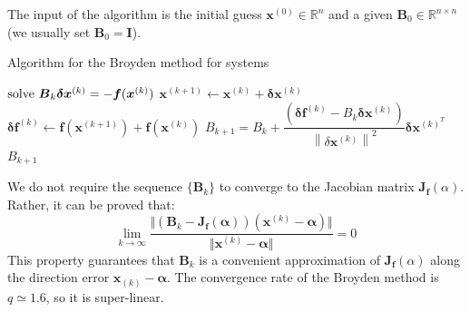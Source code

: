 \documentclass[12pt, a4paper]{report}
\begin{document}
    The input of the algorithm is the initial guess $\boldsymbol{x}^{(0)} \in \mathbb{R}^n$ and a given $\boldsymbol{B}_0 \in \mathbb{R}^{n \times n}$ (we usually set $\boldsymbol{B}_0=\boldsymbol{I}$). 
    \begin{algorithm}[H]
        \caption{Algorithm for the Broyden method for systems}
            \begin{algorithmic}[1]
                    \State $\textnormal{solve  } \boldsymbol{B}_k\boldsymbol{\delta}\boldsymbol{x}^{(k)}=-\boldsymbol{f}(\boldsymbol{x}^{(k)})$
                    \State $\boldsymbol{x}^{(k+1)} \leftarrow \boldsymbol{x}^{(k)}+\boldsymbol{\delta}\boldsymbol{x}^{(k)}$
                    \State $\boldsymbol{\delta}\boldsymbol{f}^{(k)} \leftarrow \boldsymbol{f}(\boldsymbol{x}^{(k+1)})+\boldsymbol{f}(\boldsymbol{x}^{(k)})$
                    \State $B_{k+1}=B_k+\dfrac{\left(\boldsymbol{\delta}\boldsymbol{f}^{(k)}-B_k\boldsymbol{\delta}\boldsymbol{x}^{(k)}\right)}{{\left\lVert \delta\boldsymbol{x}^{(k)} \right\rVert}^{2}}\boldsymbol{\delta}\boldsymbol{x}^{(k)^T}$
                        \State \Return $B_{k+1}$
                    \EndIf
                \EndFor
            \end{algorithmic}
    \end{algorithm}
    We do not require the sequence $\{\boldsymbol{B}_k\}$ to converge to the Jacobian matrix $\boldsymbol{J}_{\boldsymbol{f}}(\alpha)$. Rather, it can be proved that:
    \[\lim_{k \rightarrow \infty}\dfrac{\Vert \left( \boldsymbol{B}_k-\boldsymbol{J}_{\boldsymbol{f}}(\boldsymbol{\alpha}) \right) \left( \boldsymbol{x}^{(k)}-\boldsymbol{\alpha} \right) \Vert}{\Vert 
    \boldsymbol{x}^{(k)}-\boldsymbol{\alpha} \Vert}=0\]
    This property guarantees that $\boldsymbol{B}_k$ is a convenient approximation of $\boldsymbol{J}_{\boldsymbol{f}}(\alpha)$ along the direction error $\boldsymbol{x}_{(k)}-\boldsymbol{\alpha}$. 
    The convergence rate of the Broyden method is $q \simeq 1.6$, so it is super-linear. 
\end{document}
